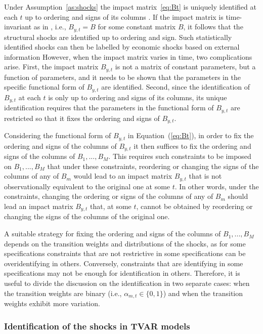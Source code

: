 \documentclass[nojss]{jss}
\begin{document}
Under Assumption~\ref{as:shocks} the impact matrix~\ref{eq:Bt} is uniquely identified at each $t$ up to ordering and signs of its columns \citep[Lemma~2]{Virolainen2:2024}. If the impact matrix is time-invariant as in \cite{Lanne+Meitz+Saikkonen:2017}, i.e., $B_{y,t}=B$ for some constant matrix $B$, it follows that the structural shocks are identified up to ordering and sign. Such statistically identified shocks can then be labelled by economic shocks based on external information However, when the impact matrix varies in time, two complications arise. First, the impact matrix $B_{y,t}$ is not a matrix of constant parameters, but a function of parameters, and it needs to be shown that the parameters in the specific functional form of $B_{y,t}$ are identified. Second, since the identification of $B_{y,t}$ at each $t$ is only up to ordering and signs of its columns, its unique identification requires that the parameters in the functional form of $B_{y,t}$ are restricted so that it fixes the ordering and signs of $B_{y,t}$.

Considering the functional form of $B_{y,t}$ in Equation~(\ref{eq:Bt}), in order to fix the ordering and signs of the columns of $B_{y,t}$ it then suffices to fix the ordering and signs of the columns of $B_1,...,B_M$. This requires such constraints to be imposed on $B_1,...,B_M$ that under these constraints, reordering or changing the signs of the columns of any of $B_m$ would lead to an impact matrix $B_{y,t}$ that is not observationally equivalent to the original one at some $t$. In other words, under the constraints, changing the ordering or signs of the columns of any of $B_m$ should lead an impact matrix $B_{y,t}$ that, at some $t$, cannot be obtained by reordering or changing the signs of the columns of the original one.

A suitable strategy for fixing the ordering and signs of the columns of $B_1,...,B_M$ depends on the transition weights and distributions of the shocks, as for some specifications constraints that are not restrictive in some specifications can be overidentifying in others. Conversely, constraints that are identifying in some specifications may not be enough for identification in others. Therefore, it is useful to divide the discussion on the identification in two separate cases: when the transition weights are binary (i.e., $\alpha_{m,t}\in\lbrace 0, 1\rbrace$) and when the transition weights exhibit more variation.

\subsubsection{Identification of the shocks in TVAR models}\label{sec:identtvar}
\end{document}
